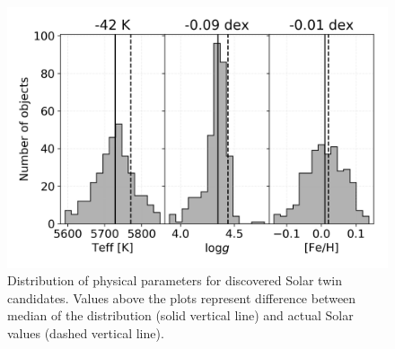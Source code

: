 \begin{figure}
	\centering
	\includegraphics[width=\columnwidth]{solar_twins_like_07_ebv_c3.png}
	\caption{Distribution of physical parameters for discovered Solar twin candidates. Values above the plots represent difference between median of the distribution (solid vertical line) and actual Solar values (dashed vertical line).}
	\label{fig:twins_stats}
\end{figure}

